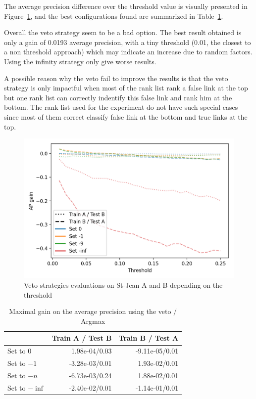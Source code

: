 The average precision difference over the threshold value is visually presented in Figure~\ref{fig:veto}, and the best configurations found are summarized in Table~\ref{tab:veto}.

Overall the veto strategy seem to be a bad option.
The best result obtained is only a gain of 0.0193 average precision, with a tiny threshold (0.01, the closest to a non threshold approach) which may indicate an increase due to random factors.
Using the infinity strategy only give worse results.

A possible reason why the veto fail to improve the results is that the veto strategy is only impactful when most of the rank list rank a false link at the top but one rank list can correctly indentify this false link and rank him at the bottom.
The rank list used for the experiment do not have such special cases since most of them correct classify false link at the bottom and true links at the top.

\begin{figure}
  \caption{Veto strategies evaluations on St-Jean A and B depending on the threshold}
  \label{fig:veto}
  \includegraphics[width=\linewidth]{img/veto.png}
\end{figure}

\begin{table}
  \centering
  \caption{Maximal gain on the average precision using the veto / Argmax}
  \label{tab:veto}
  \begin{tabular}{l r r}
    \toprule
                   & Train A / Test B & Train B / Test A \\
    \midrule
    Set to $0$     & 1.98e-04/0.03 & -9.11e-05/0.01 \\
    Set to $-1$    & -3.28e-03/0.01 & 1.93e-02/0.01 \\
    Set to $-n$    & -6.73e-03/0.24 & 1.88e-02/0.01 \\
    Set to $-\inf$ & -2.40e-02/0.01 & -1.14e-01/0.01 \\
    \bottomrule
  \end{tabular}
\end{table}

